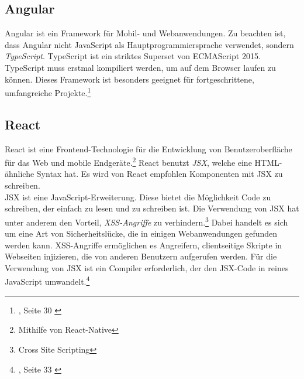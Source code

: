 \subsection*{Angular}
Angular ist ein Framework für Mobil- und Webanwendungen.
Zu beachten ist, dass Angular nicht JavaScript als Hauptprogrammiersprache verwendet, sondern \textit{TypeScript}.
TypeScript ist ein striktes Superset von ECMAScript 2015.
TypeScript muss erstmal kompiliert werden, um auf dem Browser laufen zu können{\cite{MS1}}. Dieses Framework ist besonders geeignet für fortgeschrittene, umfangreiche Projekte.\footnote{{}, Seite 30 \cite{AN1}}

\subsection*{React}
React ist eine Frontend-Technologie für die Entwicklung von Benutzeroberfläche für das Web und mobile Endgeräte\cite{GH08}.\footnote{Mithilfe von React-Native} React benutzt \textit{JSX}, welche eine HTML-ähnliche Syntax hat. Es wird von React empfohlen Komponenten mit JSX zu schreiben\cite{JSX1}. 
\\
JSX ist eine JavaScript-Erweiterung. Diese bietet die Möglichkeit Code zu schreiben, der einfach zu lesen und zu schreiben ist. Die Verwendung von JSX hat unter anderem den Vorteil, \textit{XSS-Angriffe} zu verhindern.\footnote{Cross Site Scripting{\cite{OWASP}}} \cite{JSX1} Dabei handelt es sich um eine Art von Sicherheitslücke, die in einigen Webanwendungen gefunden werden kann. XSS-Angriffe ermöglichen es Angreifern, clientseitige Skripte in Webseiten injizieren, die von anderen Benutzern aufgerufen werden. Für die Verwendung von JSX ist ein Compiler erforderlich, der den JSX-Code in reines JavaScript umwandelt.\footnote{, Seite 33 \cite{E01}}

